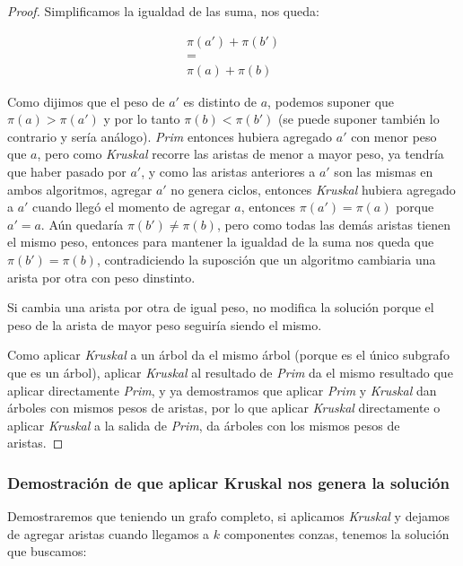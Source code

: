 \begin{proof}
Simplificamos la igualdad de las suma, nos queda:

	\begin{equation*}
	\begin{split}
		\pi(a') + \pi(b') \\
		=\\
		\pi(a) + \pi(b)
	\end{split}
	\end{equation*}

	Como dijimos que el peso de $a'$ es distinto de $a$, podemos suponer que $\pi(a) > \pi(a')$ y por lo tanto $\pi(b) < \pi(b')$ (se puede suponer tambi\'en lo contrario y ser\'ia an\'alogo). \emph{Prim} entonces hubiera agregado $a'$ con menor peso que $a$, pero como \emph{Kruskal} recorre las aristas de menor a mayor peso, ya tendr\'ia que haber pasado por $a'$, y como las aristas anteriores a $a'$ son las mismas en ambos algoritmos, agregar $a'$ no genera ciclos, entonces \emph{Kruskal} hubiera agregado a $a'$ cuando lleg\'o el momento de agregar $a$, entonces $\pi(a') = \pi(a)$ porque $a' = a$. A\'un quedar\'ia $\pi(b') \neq \pi(b)$, pero como todas las dem\'as aristas tienen el mismo peso, entonces para mantener la igualdad de la suma nos queda que $\pi(b') = \pi(b)$, contradiciendo la suposci\'on que un algoritmo cambiaria una arista por otra con peso dinstinto.

	Si cambia una arista por otra de igual peso, no modifica la soluci\'on porque el peso de la arista de mayor peso seguir\'ia siendo el mismo.

	Como aplicar \emph{Kruskal} a un \'arbol da el mismo \'arbol (porque es el \'unico subgrafo que es un \'arbol), aplicar \emph{Kruskal} al resultado de \emph{Prim} da el mismo resultado que aplicar directamente \emph{Prim}, y ya demostramos que aplicar \emph{Prim} y \emph{Kruskal} dan \'arboles con mismos pesos de aristas, por lo que aplicar \emph{Kruskal} directamente o aplicar \emph{Kruskal} a la salida de \emph{Prim}, da \'arboles con los mismos pesos de aristas.

\end{proof}

\subsubsection{Demostraci\'on de que aplicar Kruskal nos genera la soluci\'on} \label{ej_2:demo:p}

Demostraremos que teniendo un grafo completo, si aplicamos \emph{Kruskal} y dejamos de agregar aristas cuando llegamos a $k$ componentes conzas, tenemos la soluci\'on que buscamos:


